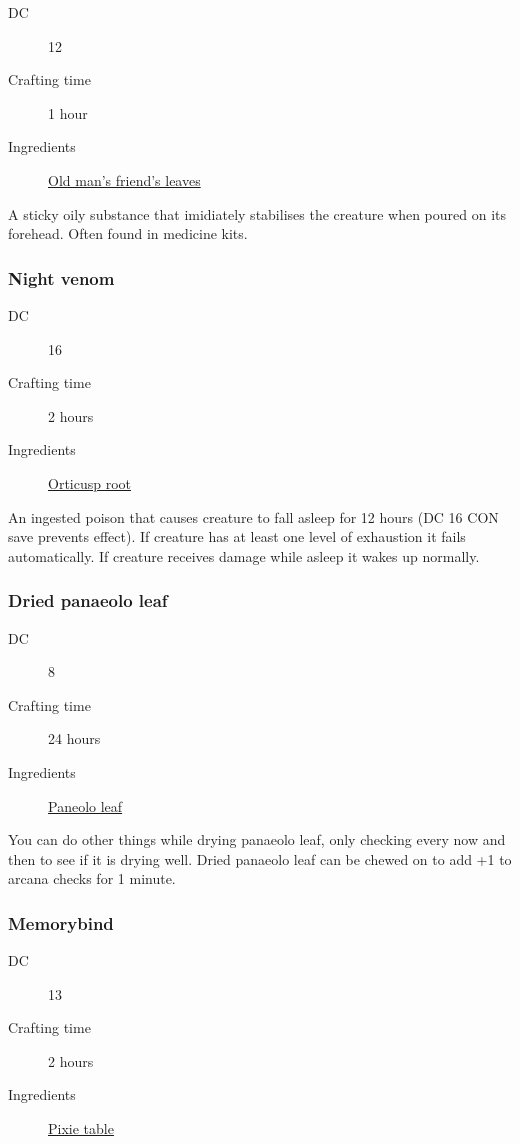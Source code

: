 \begin{description}
\item [DC] 12
\item [Crafting time] 1 hour
\item [Ingredients] \hyperref[Old Man's Friend]{Old man's friend's leaves}
\end{description}

A sticky oily substance that imidiately stabilises the creature when poured on its forehead. 
Often found in medicine kits.

\subsubsection{Night venom}
\label{Night venom}

\begin{description}
\item [DC] 16
\item [Crafting time] 2 hours
\item [Ingredients] \hyperref[Orticusp]{Orticusp root}
\end{description}

An ingested poison that causes creature to fall asleep for 12 hours (DC 16 CON save prevents effect). 
If creature has at least one level of exhaustion it fails automatically. 
If creature receives damage while asleep it wakes up normally.

\subsubsection{Dried panaeolo leaf}
\label{Dried panaeolo leaf}

\begin{description}
\item [DC] 8
\item [Crafting time] 24 hours
\item [Ingredients] \hyperref[Panaeolo]{Paneolo leaf}
\end{description}

You can do other things while drying panaeolo leaf, only checking every now and then to 
see if it is drying well. Dried panaeolo leaf can be chewed on to add +1 to arcana checks for 1 minute.

\subsubsection{Memorybind}
\label{Memorybind}

\begin{description}
\item [DC] 13
\item [Crafting time] 2 hours
\item [Ingredients] \hyperref[Pixie table]{Pixie table}
\end{description}

